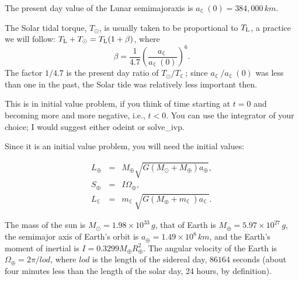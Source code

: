 \documentclass[12pt]{article}
\begin{document}
The present day value of the Lunar semimajoraxis is $a_{\leftmoon}(0)=384,000\, km$.

The Solar tidal torque, $T_\odot$, is usually taken to be proportional to $T_{\rm L}$, a practice we will follow: $T_{\rm L}+T_\odot=T_{\rm L}(1+\beta)$, where
\begin{equation}
  \beta = \frac{1}{4.7}  \left(\frac{a_{\leftmoon}}{a_{\leftmoon}(0)}\right)^6.
\end{equation}
The factor $1/4.7$ is the present day ratio of $T_\odot/T_{\leftmoon}$; since $a_{\leftmoon}/a_{\leftmoon}(0)$ was less than one in the past, the Solar tide was relatively less important then.

This is in initial value problem, if you think of time starting at $t=0$ and becoming more and more negative, i.e., $t<0$. You can use the integrator of your choice; I would suggest either odeint or solve\_ivp.

Since it is an initial value problem, you will need the initial values:

\begin{eqnarray}
L_\oplus &=& M_\oplus\sqrt{G(M_\odot + M_\oplus) a_\oplus},\\
S_\oplus &=& I\Omega_\oplus,\\
L_{\leftmoon} &=& m_{\leftmoon}\sqrt{G(M_\oplus+m_{\leftmoon}) a_{\leftmoon}}.
\end{eqnarray}

The mass of the sun is $M_\odot=1.98\times10^{33}\, g$, that of Earth is $M_\oplus=5.97\times10^{27}\, g$, the semimajor axis of Earth's orbit is $a_\oplus=1.49\times10^8\, km$, and the Earth's moment of inertial is $I=0.3299M_\oplus R_\oplus^2$. The angular velocity of the Earth is $\Omega_\oplus=2\pi/lod$, where $lod$ is the length of the sidereal day, $86164$ seconds (about four minutes less than the length of the solar day, 24 hours, by definition).
\end{document}
